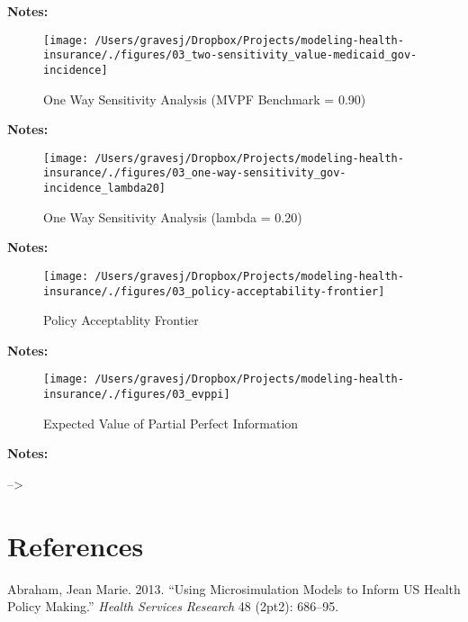 \documentclass[
  10pt,
]{article}
\begin{document}
\textbf{Notes:} \newpage

\begin{figure}
\texttt{[image: /Users/gravesj/Dropbox/Projects/modeling-health-insurance/./figures/03\_two-sensitivity\_value-medicaid\_gov-incidence]} \caption{\label{fig_oneway90}One Way Sensitivity Analysis (MVPF Benchmark = 0.90)}\label{fig:unnamed-chunk-6}
\end{figure}

\textbf{Notes:}

\newpage

\begin{figure}
\texttt{[image: /Users/gravesj/Dropbox/Projects/modeling-health-insurance/./figures/03\_one-way-sensitivity\_gov-incidence\_lambda20]} \caption{\label{fig_oneway20}One Way Sensitivity Analysis (lambda = 0.20)}\label{fig:unnamed-chunk-7}
\end{figure}

\textbf{Notes:} \newpage

\begin{figure}
\texttt{[image: /Users/gravesj/Dropbox/Projects/modeling-health-insurance/./figures/03\_policy-acceptability-frontier]} \caption{\label{fig_policy_acceptability_frontier}Policy Acceptablity Frontier}\label{fig:unnamed-chunk-8}
\end{figure}

\textbf{Notes:} \newpage

\newpage
\begin{figure}
\texttt{[image: /Users/gravesj/Dropbox/Projects/modeling-health-insurance/./figures/03\_evppi]} \caption{\label{fig_evppi}Expected Value of Partial Perfect Information}\label{fig:unnamed-chunk-9}
\end{figure}

\textbf{Notes:} \newpage

--\textgreater{}

\hypertarget{references}{%
\section{References}\label{references}}

\singlespacing

\hypertarget{refs}{}
\leavevmode\hypertarget{ref-AbrahamUsingmicrosimulationmodels2013}{}%
Abraham, Jean Marie. 2013. ``Using Microsimulation Models to Inform US
Health Policy Making.'' \emph{Health Services Research} 48 (2pt2):
686--95.
\end{document}
